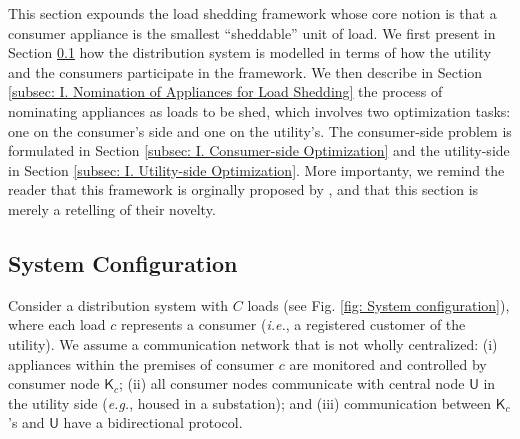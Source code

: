 \documentclass[journal, a4paper]{IEEEtran}
\begin{document}
This section expounds the load shedding framework whose core notion is that a consumer appliance is the smallest ``sheddable'' unit of load.
We first present in Section \ref{subsec: I. System Configuration} how the distribution system is
modelled in terms of how the utility and the consumers participate in the framework.
We then describe in Section \ref{subsec: I. Nomination of Appliances for Load Shedding} the process of nominating appliances as loads to be shed,
which involves two optimization tasks: one on the consumer's side and one on the utility's.
The consumer-side problem is formulated in Section \ref{subsec: I. Consumer-side Optimization}
and the utility-side in Section \ref{subsec: I. Utility-side Optimization}.
More importanty, we remind the reader that this framework is orginally proposed by \cite{Jabian2020},
and that this section is merely a retelling of their novelty.

\subsection{System Configuration}
\label{subsec: I. System Configuration}

Consider a distribution system with $C$ loads (see Fig. \ref{fig: System configuration}),
where each load $c$ represents a consumer (\textit{i.e.}, a registered customer of the utility).
We assume a communication network that is not wholly centralized:
(i) appliances within the premises of consumer $c$ are monitored and controlled by consumer node $\mathsf{K}_{c}$;
(ii) all consumer nodes communicate with central node $\mathsf{U}$ in the utility side (\textit{e.g.}, housed in a substation); and
(iii) communication between $\mathsf{K}_{c}$'s and $\mathsf{U}$ have a bidirectional protocol.
\end{document}

